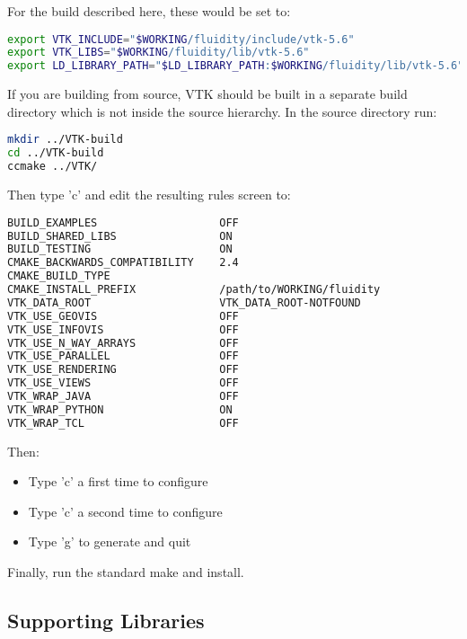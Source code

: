 For the build described here, these would be set to:

\begin{lstlisting}[language=bash]
export VTK_INCLUDE="$WORKING/fluidity/include/vtk-5.6"
export VTK_LIBS="$WORKING/fluidity/lib/vtk-5.6"
export LD_LIBRARY_PATH="$LD_LIBRARY_PATH:$WORKING/fluidity/lib/vtk-5.6"
\end{lstlisting}

If you are building from source, VTK should be built in a separate build
directory which is not inside the source hierarchy. In the source directory
run:

\begin{lstlisting}[language=bash]
mkdir ../VTK-build
cd ../VTK-build
ccmake ../VTK/
\end{lstlisting}

Then type 'c' and edit the resulting rules screen to:

\begin{lstlisting}[language=bash]
BUILD_EXAMPLES                   OFF
BUILD_SHARED_LIBS                ON                                     
BUILD_TESTING                    ON
CMAKE_BACKWARDS_COMPATIBILITY    2.4
CMAKE_BUILD_TYPE
CMAKE_INSTALL_PREFIX             /path/to/WORKING/fluidity          
VTK_DATA_ROOT                    VTK_DATA_ROOT-NOTFOUND
VTK_USE_GEOVIS                   OFF                                    
VTK_USE_INFOVIS                  OFF                                    
VTK_USE_N_WAY_ARRAYS             OFF
VTK_USE_PARALLEL                 OFF
VTK_USE_RENDERING                OFF                                    
VTK_USE_VIEWS                    OFF                                    
VTK_WRAP_JAVA                    OFF
VTK_WRAP_PYTHON                  ON                                     
VTK_WRAP_TCL                     OFF
\end{lstlisting}

Then:

\begin{itemize}
  \item Type 'c' a first time to configure
  \item Type 'c' a second time to configure
  \item Type 'g' to generate and quit
\end{itemize}

Finally, run the standard make and install.

\subsection{Supporting Libraries}
\label{sec:required_libraries_supporting}

